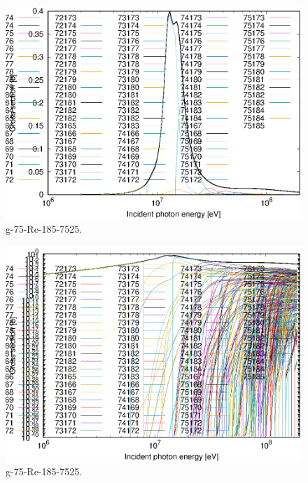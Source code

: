 \begin{figure}
 \includegraphics[width=\linewidth]{eps/g_75-Re-185_7525.eps}
  \caption{g-75-Re-185-7525.}
\end{figure}
\begin{figure}
 \includegraphics[width=\linewidth]{eps-log/g_75-Re-185_7525.eps}
 \caption{g-75-Re-185-7525.}
\end{figure}
\newpage \clearpage

